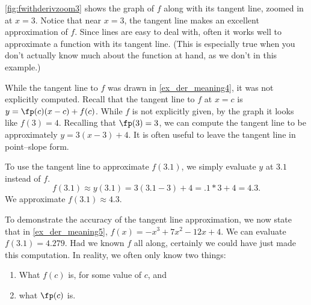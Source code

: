 {\autoref{fig:fwithderivzoom3} shows the graph of $f$ along with its tangent line, zoomed in at $x=3$. Notice that near $x=3$, the tangent line makes an excellent approximation of $f$. Since lines are easy to deal with, often it works well to approximate a function with its tangent line. (This is especially true when you don't actually know much about the function at hand, as we don't in this example.)

While the tangent line to $f$ was drawn in \autoref{ex_der_meaning4}, it was not explicitly computed. Recall that the tangent line to $f$ at $x=c$ is $y = \fp(c)(x-c)+f(c)$. While $f$ is not explicitly given, by the graph it looks like $f(3) = 4$. Recalling that $\fp(3) = 3$, we can compute the tangent line to be approximately $y = 3(x-3)+4.$ It is often useful to leave the tangent line in point--slope form.

To use the tangent line to approximate $f(3.1)$, we simply evaluate $y$ at $3.1$ instead of $f$.
\[f(3.1) \approx y(3.1) = 3(3.1-3)+4 = .1*3+4 = 4.3.\]
We approximate $f(3.1) \approx 4.3.$}

To demonstrate the accuracy of the tangent line approximation, we now state that in \autoref{ex_der_meaning5}, $f(x) = -x^3+7x^2-12x+4$. We can evaluate $f(3.1) = 4.279$. Had we known $f$ all along, certainly we could have just made this computation. In reality, we often only know two things:
\begin{enumerate}
	\item	What $f(c)$ is, for some value of $c$, and
	\item	what $\fp(c)$ is.
\end{enumerate}
	

